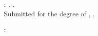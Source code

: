 \thispagestyle{empty}


 



\hfill

\vfill

\noindent\myName: \textit{\myTitle,} \myYear.\\
Submitted for the degree of \myDegree, \myUni. \\

\bigskip

: \\
\mySupervisor

